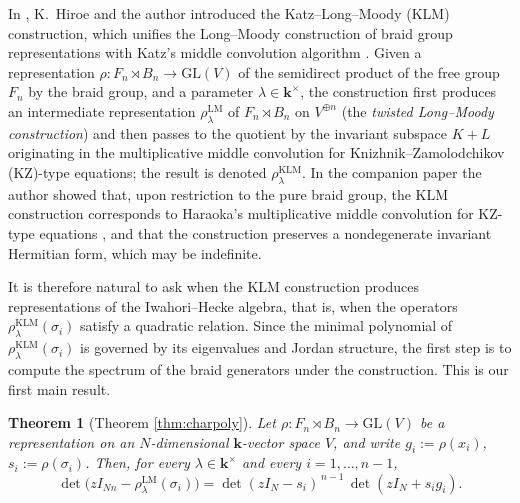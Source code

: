 \documentclass[11pt]{article}
\newtheorem{theorem}{Theorem}[section]
\theoremstyle{definition}
\theoremstyle{remark}
\newcommand{\GL}{\mathrm{GL}}
\newcommand{\kk}{\boldsymbol{k}}
\newcommand{\rLMl}{\rho^{\mathrm{LM}}_{\lambda}}
\newcommand{\rKLM}{\rho^{\mathrm{KLM}}_{\lambda}}
\begin{document}
In \cite{HiroeNegami23}, K.~Hiroe and the author introduced the
Katz--Long--Moody (KLM) construction, which unifies the Long--Moody
construction of braid group representations \cite{Long94}
with Katz's middle convolution algorithm \cite{Katz96, DettweilerReiter00,
DettweilerReiter07}. Given a representation
$\rho \colon F_n \rtimes B_n \to \GL(V)$ of the semidirect product of the
free group $F_n$ by the braid group, and a parameter
$\lambda \in \kk^{\times}$, the construction first produces an intermediate
representation $\rLMl$ of $F_n \rtimes B_n$ on $V^{\oplus n}$ (the
\emph{twisted Long--Moody construction}) and then passes to the quotient by
the invariant subspace $K + L$ originating in the multiplicative middle
convolution for Knizhnik--Zamolodchikov (KZ)-type equations; the result
is denoted $\rKLM$.
In the companion paper \cite{Negami25} the author showed that, upon
restriction to the pure braid group, the KLM construction corresponds to
Haraoka's multiplicative middle convolution for KZ-type equations
\cite{Haraoka12, Haraoka20}, and that the construction preserves a nondegenerate invariant
Hermitian form, which may be indefinite.

It is therefore natural to ask when the KLM construction produces
representations of the Iwahori--Hecke algebra, that is, when the operators
$\rKLM(\sigma_i)$ satisfy a quadratic relation. Since the minimal polynomial
of $\rKLM(\sigma_i)$ is governed by its eigenvalues and Jordan structure,
the first step is to compute the spectrum of the braid generators under the
construction. This is our first main result.

\begin{theorem}[Theorem \ref{thm:charpoly}]\label{thm:A}
Let $\rho \colon F_n \rtimes B_n \to \GL(V)$ be a representation on an
$N$-dimensional $\kk$-vector space $V$, and write $g_i := \rho(x_i)$,
$s_i := \rho(\sigma_i)$. Then, for every $\lambda \in \kk^{\times}$ and
every $i = 1, \dots, n-1$,
\[
\det\bigl(z I_{Nn} - \rLMl(\sigma_i)\bigr)
= \det(z I_N - s_i)^{\,n-1}\,\det(z I_N + s_i g_i).
\]
\end{theorem}
\end{document}

